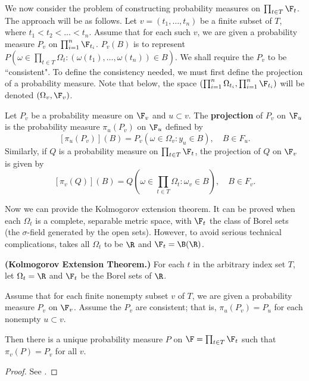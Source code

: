 \documentclass{article} %
\begin{document}
We now consider the problem of constructing probability measures on $\prod_{t \in T} \F_t$.  The approach will be as follows.  Let $v=(t_1, \hdots, t_n)$ be a finite subset of $T$, where $t_1 < t_2 < \hdots < t_n$.  Assume that for each such $v$, we are given a probability measure $P_v$ on $\prod_{i=1}^n \F_{t_i}$.   $P_v(B)$ is to represent $P(\omega \in \prod_{t \in T} \Omega_t : (\omega(t_1), \hdots, \omega(t_n)) \in B)$.  We shall require the $P_v$ to be ``consistent".  To define the consistency needed, we must first define the projection of a probability measure.  Note that below,  the space $(\prod_{i=1}^n \Omega_{t_i}, \prod_{i=1}^n \F_{t_i})$ will be denoted $(\Omega_v, \F_v)$. 

\begin{definition}
Let $P_v$ be a probability measure on $\F_v$ and $u \subset v$. The \textbf{projection} of $P_v$ on $\F_u$ is the probability measure $\pi_u(P_v)$ on $\F_u$ defined by
\[ [\pi_u(P_v)](B) = P_v(\omega \in \Omega_v : y_u \in B), \quad B \in F_u. \]
Similarly, if $Q$ is a probability measure on $\prod_{t \in T} \F_t$, the projection of $Q$ on $\F_v$ is given by 
\[ [\pi_v(Q)](B) = Q(\omega \in \prod_{t \in T} \Omega_t : \omega_v \in B), \quad B \in F_v. \]
\label{def:projection_of_probability_measure}
\end{definition}

Now we can provide the Kolmogorov extension theorem.  It can be proved when each $\Omega_t$ is a complete, separable metric space, with $\F_t$ the class of Borel sets (the $\sigma$-field generated by the open sets). However, to avoid serious technical complications, \cite{ash2000probability} takes all $\Omega_t$ to be $\R$ and $\F_t =\B(\R)$. 

\begin{theorem}\textnormal{\textbf{(Kolmogorov Extension Theorem.)}} For each $t$ in the arbitrary index set $T$, let $\Omega_t = \R$ and $\F_t$ be the Borel sets of $\R$.  

Assume that for each finite nonempty subset $v$ of $T$, we are given a probability measure $P_v$ on $\F_v$.   Assume the $P_v$ are consistent; that is, $\pi_u(P_v) = P_u$ for each nonempty $u \subset v$. 

Then there is a unique probability measure $P$ on $\F = \prod_{t \in T} \F_t$ such that $\pi_v(P)=P_v$ for all $v$.
\end{theorem}

\begin{proof}
See \cite[pp.18]{ash2000probability}.	
\end{proof}
\end{document}
